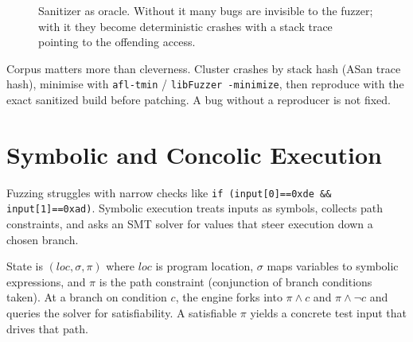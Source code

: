 \begin{figure}[h]\centering
{}
\caption{Sanitizer as oracle. Without it many bugs are invisible to the fuzzer; with it they become deterministic crashes with a stack trace pointing to the offending access.}
\label{fig:sanitizer}
\end{figure}

Corpus matters more than cleverness. Cluster crashes by stack hash (ASan trace hash), minimise with \texttt{afl-tmin} / \texttt{libFuzzer -minimize}, then reproduce with the exact sanitized build before patching. A bug without a reproducer is not fixed.

\section{Symbolic and Concolic Execution}
\label{sec:symbolic}
Fuzzing struggles with narrow checks like \texttt{if (input[0]==0xde \&\& input[1]==0xad)}. Symbolic execution treats inputs as symbols, collects path constraints, and asks an SMT solver for values that steer execution down a chosen branch.

\begin{definition}
State is $(loc, \sigma, \pi)$ where $loc$ is program location, $\sigma$ maps variables to symbolic expressions, and $\pi$ is the path constraint (conjunction of branch conditions taken). At a branch on condition $c$, the engine forks into $\pi\land c$ and $\pi\land \neg c$ and queries the solver for satisfiability. A satisfiable $\pi$ yields a concrete test input that drives that path.
\end{definition}

